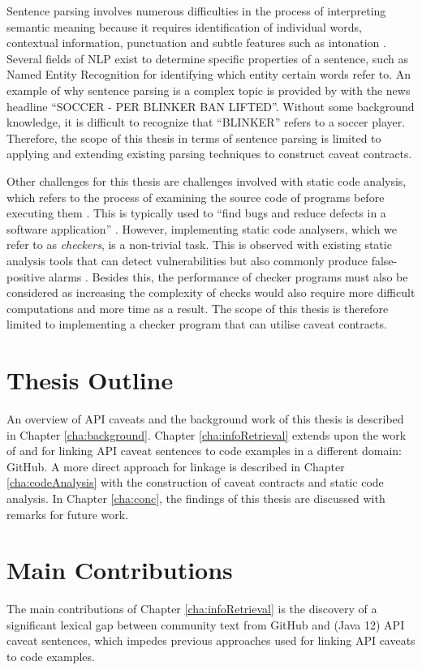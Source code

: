 Sentence parsing involves numerous difficulties in the process of interpreting semantic meaning because it requires identification of individual words, contextual information, punctuation and subtle features such as intonation \cite{mitchell1994sentence}. Several fields of NLP exist to determine specific properties of a sentence, such as Named Entity Recognition for identifying which entity certain words refer to. An example of why sentence parsing is a complex topic is provided by \cite{ratinov-roth-2009-design} with the news headline ``SOCCER - PER BLINKER BAN LIFTED''. Without some background knowledge, it is difficult to recognize that ``BLINKER'' refers to a soccer player.  Therefore, the scope of this thesis in terms of sentence parsing is limited to applying and extending existing parsing techniques to construct caveat contracts. \bigbreak

Other challenges for this thesis are challenges involved with static code analysis, which refers to the process of examining the source code of programs before executing them \cite{baca2009static}. This is typically used to ``find bugs and reduce defects in a software application'' \cite{bardas2010static}. However, implementing static code analysers, which we refer to as \textit{checkers}, is a non-trivial task. This is observed with existing static analysis tools that can detect vulnerabilities but also commonly produce false-positive alarms \cite{zitser2004testing}. Besides this, the performance of checker programs must also be considered as increasing the complexity of checks would also require more difficult computations and more time as a result. The scope of this thesis is therefore limited to implementing a checker program that can utilise caveat contracts. 

\section{Thesis Outline}
\label{sec:outline}
An overview of API caveats and the background work of this thesis is described in Chapter \ref{cha:background}. Chapter \ref{cha:infoRetrieval} extends upon the work of \cite{jiamou} and \cite{xiaoxue} for linking API caveat sentences to code examples in a different domain: GitHub. A more direct approach for linkage is described in Chapter \ref{cha:codeAnalysis} with the construction of caveat contracts and static code analysis. In Chapter \ref{cha:conc}, the findings of this thesis are discussed with remarks for future work.

\section{Main Contributions}
The main contributions of Chapter \ref{cha:infoRetrieval} is the discovery of a significant lexical gap between community text from GitHub and (Java 12) API caveat sentences, which impedes previous approaches used for linking API caveats to code examples.\\

